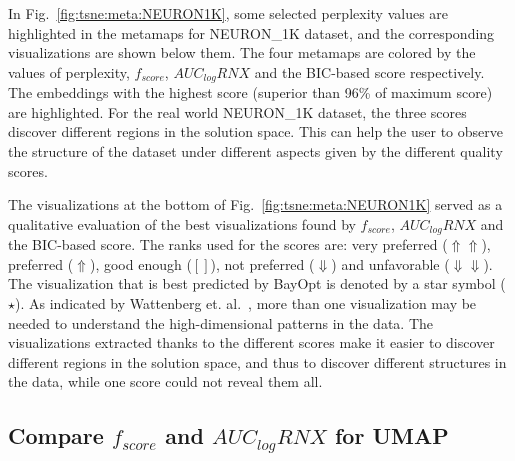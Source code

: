 In Fig.~\ref{fig:tsne:meta:NEURON1K}, some selected perplexity values are highlighted in the metamaps for {NEURON\_1K} dataset, and the corresponding visualizations are shown below them.
The four metamaps are colored by the values of perplexity, $f_{score}$, $AUC_{log}RNX$ and the BIC-based score respectively.
The embeddings with the highest score (superior than 96\% of maximum score) are highlighted.
For the real world {NEURON\_1K} dataset, the three scores discover different regions in the solution space. This can help the user to observe the structure of the dataset under different aspects given by the different quality scores.

The visualizations at the bottom of Fig.~\ref{fig:tsne:meta:NEURON1K} served as a qualitative evaluation of the best visualizations found by $f_{score}$, $AUC_{log}RNX$ and the BIC-based score.
The ranks used for the scores are: very preferred ($\Uparrow\Uparrow$), preferred ($\Uparrow$), good enough ($[]$), not preferred ($\Downarrow$) and unfavorable ($\Downarrow\Downarrow$).
The visualization that is best predicted by BayOpt is denoted by a star symbol ($\star$).
As indicated by Wattenberg et. al.~\cite{wattenberg2016use}, more than one visualization may be needed to understand the high-dimensional patterns in the data.
The visualizations extracted thanks to the different scores make it easier to discover different regions in the solution space, and thus to discover different structures in the data, while one score could not reveal them all.

\subsection{Compare $f_{score}$ and $AUC_{log}RNX$ for UMAP}\label{sec:compare:umap}

